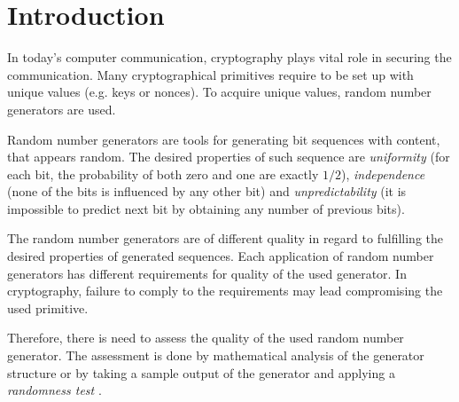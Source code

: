 \documentclass[
  digital,     %
  oneside,     %
  nosansbold,  %
  nocolorbold, %
  nolof,         %
  nolot,         %
]{fithesis4}
\begin{document}
\chapter*{Introduction}

In today's computer communication, cryptography plays vital role in securing the communication. Many cryptographical primitives require to be set up with unique values (e.g. keys or nonces). To acquire unique values, random number generators are used.


Random number generators are tools for generating bit sequences with content, that appears random. The desired properties \cite[p.~1-1]{nist_special} of such sequence are \emph{uniformity} (for each bit, the probability of both zero and one are exactly $1/2$), \emph{independence} (none of the bits is influenced by any other bit) and \emph{unpredictability} (it is impossible to predict next bit by obtaining any number of previous bits). 

The random number generators are of different quality in regard to fulfilling the desired properties of generated sequences. Each application of random number generators has different requirements for quality of the used generator. In cryptography, failure to comply to the requirements may lead compromising the used primitive.

Therefore, there is need to assess the quality of the used random number generator. The assessment is done by mathematical analysis of the generator structure or by taking a sample output of the generator and applying a \emph{randomness test} \cite[p.~2]{tu01_guide}.

\end{document}
